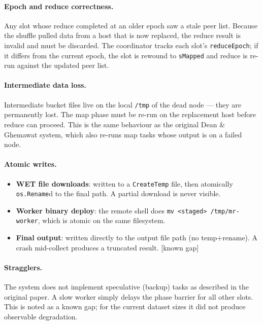 \documentclass[11pt,a4paper]{article}
\begin{document}
\paragraph{Epoch and reduce correctness.}
Any slot whose reduce completed at an older epoch saw a stale peer list.
Because the shuffle pulled data from a host that is now replaced, the reduce
result is invalid and must be discarded. The coordinator tracks each slot's
\texttt{reduceEpoch}; if it differs from the current epoch, the slot is rewound
to \texttt{sMapped} and reduce is re-run against the updated peer list.

\paragraph{Intermediate data loss.}
Intermediate bucket files live on the local \texttt{/tmp} of the dead node —
they are permanently lost. The map phase must be re-run on the replacement host
before reduce can proceed. This is the same behaviour as the original Dean \&
Ghemawat system, which also re-runs map tasks whose output is on a failed node.

\paragraph{Atomic writes.}
\begin{itemize}[leftmargin=1.5em]
  \item \textbf{WET file downloads}: written to a \texttt{CreateTemp} file,
  then atomically \texttt{os.Rename}d to the final path. A partial download is
  never visible.
  \item \textbf{Worker binary deploy}: the remote shell does \texttt{mv
  <staged> /tmp/mr-worker}, which is atomic on the same filesystem. 
  \item \textbf{Final output}: written directly to the output file path (no
  temp+rename). A crash mid-collect produces a truncated result. \textsf{[known
  gap]}
\end{itemize}

\paragraph{Stragglers.}
The system does not implement speculative (backup) tasks as described in the
original paper. A slow worker simply delays the phase barrier for all other
slots. This is noted as a known gap; for the current dataset sizes it did not
produce observable degradation.
\end{document}
